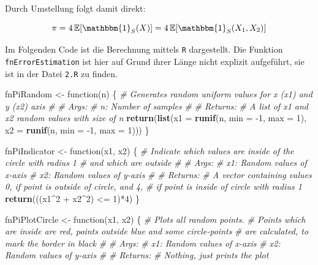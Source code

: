 \documentclass[10pt,]{article}
\newenvironment{Shaded}{\begin{snugshade}}{\end{snugshade}}
\newcommand{\KeywordTok}[1]{\textcolor[rgb]{0.13,0.29,0.53}{\textbf{{#1}}}}
\newcommand{\DataTypeTok}[1]{\textcolor[rgb]{0.13,0.29,0.53}{{#1}}}
\newcommand{\DecValTok}[1]{\textcolor[rgb]{0.00,0.00,0.81}{{#1}}}
\newcommand{\StringTok}[1]{\textcolor[rgb]{0.31,0.60,0.02}{{#1}}}
\newcommand{\CommentTok}[1]{\textcolor[rgb]{0.56,0.35,0.01}{\textit{{#1}}}}
\newcommand{\NormalTok}[1]{{#1}}
\begin{document}
Durch Umstellung folgt damit direkt:

\begin{equation*}
\pi = 4\,\mathbb{E}[\mathbbm{1}_S(X)] = 4\,\mathbb{E}[\mathbbm{1}_S(X_1,X_2)]
\end{equation*}

Im Folgenden Code ist die Berechnung mittels \texttt{R} dargestellt. Die
Funktion \texttt{fnErrorEstimation} ist hier auf Grund ihrer Länge nicht
explizit aufgeführt, sie ist in der Datei \texttt{2.R} zu finden.

\begin{Shaded}
\begin{Highlighting}[]
\NormalTok{fnPiRandom <-}\StringTok{ }\NormalTok{function(n) \{}
  \CommentTok{# Generates random uniform values for x (x1) and y (x2) axis}
  \CommentTok{# }
  \CommentTok{# Args:}
  \CommentTok{#   n: Number of samples}
  \CommentTok{#   }
  \CommentTok{# Returns:}
  \CommentTok{#   A list of x1 and x2 random values with size of n}
  \KeywordTok{return}\NormalTok{(}\KeywordTok{list}\NormalTok{(}\DataTypeTok{x1 =} \KeywordTok{runif}\NormalTok{(n, }\DataTypeTok{min =} \NormalTok{-}\DecValTok{1}\NormalTok{, }\DataTypeTok{max =} \DecValTok{1}\NormalTok{),}
              \DataTypeTok{x2 =} \KeywordTok{runif}\NormalTok{(n, }\DataTypeTok{min =} \NormalTok{-}\DecValTok{1}\NormalTok{, }\DataTypeTok{max =} \DecValTok{1}\NormalTok{)))}
\NormalTok{\}}

\NormalTok{fnPiIndicator <-}\StringTok{ }\NormalTok{function(x1, x2) \{}
  \CommentTok{# Indicate which values are inside of the circle with radius 1}
  \CommentTok{# and which are outside}
  \CommentTok{# }
  \CommentTok{# Args:}
  \CommentTok{#   x1: Random values of x-axis}
  \CommentTok{#   x2: Random values of y-axis}
  \CommentTok{#   }
  \CommentTok{# Returns:}
  \CommentTok{#   A vector containing values 0, if point is outside of circle, and 4, }
  \CommentTok{#   if point is inside of circle with radius 1}
  \KeywordTok{return}\NormalTok{(((x1^}\DecValTok{2} \NormalTok{+}\StringTok{ }\NormalTok{x2^}\DecValTok{2}\NormalTok{) <=}\StringTok{ }\DecValTok{1}\NormalTok{)*}\DecValTok{4}\NormalTok{)}
\NormalTok{\}}

\NormalTok{fnPiPlotCircle <-}\StringTok{ }\NormalTok{function(x1, x2) \{}
  \CommentTok{# Plots all random points.}
  \CommentTok{# Points which are inside are red, points outside blue and some circle-points}
  \CommentTok{# are calculated, to mark the border in black}
  \CommentTok{# }
  \CommentTok{# Args:}
  \CommentTok{#   x1: Random values of x-axis}
  \CommentTok{#   x2: Random values of y-axis}
  \CommentTok{#   }
  \CommentTok{# Returns:}
  \CommentTok{#   Nothing, just prints the plot}
  

\end{Highlighting}
\end{Shaded}
\end{document}
